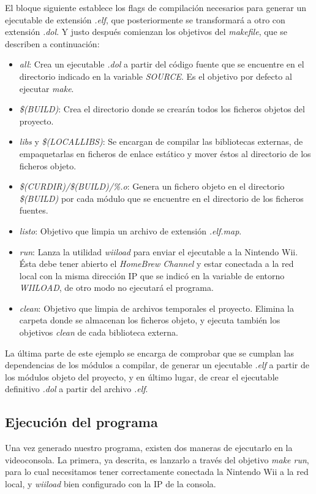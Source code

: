 El bloque siguiente establece los flags de compilación necesarios para generar un ejecutable de extensión \emph{.elf}, que posteriormente se transformará a otro con extensión \emph{.dol}. Y justo después comienzan los objetivos del \emph{makefile}, que se describen a continuación:

\begin{itemize}
\item \emph{all}: Crea un ejecutable \emph{.dol} a partir del código fuente que se encuentre en el directorio indicado en la variable \emph{SOURCE}. Es el objetivo por defecto al ejecutar \emph{make}.
\item \emph{\$(BUILD)}: Crea el directorio donde se crearán todos los ficheros objetos del proyecto.
\item \emph{libs} y \emph{\$(LOCALLIBS)}: Se encargan de compilar las bibliotecas externas, de empaquetarlas en ficheros de enlace estático y mover éstos al directorio de los ficheros objeto.
\item \emph{\$(CURDIR)/\$(BUILD)/\%.o}: Genera un fichero objeto en el directorio \emph{\$(BUILD)} por cada módulo que se encuentre en el directorio de los ficheros fuentes.
\item \emph{listo}: Objetivo que limpia un archivo de extensión \emph{.elf.map}.
\item \emph{run}: Lanza la utilidad \emph{wiiload} para enviar el ejecutable a la Nintendo Wii. Ésta debe tener abierto el \emph{HomeBrew Channel} y estar conectada a la red local con la misma dirección IP que se indicó en la variable de entorno \emph{WIILOAD}, de otro modo no ejecutará el programa.
\item \emph{clean}: Objetivo que limpia de archivos temporales el proyecto. Elimina la carpeta donde se almacenan los ficheros objeto, y ejecuta también los objetivos \emph{clean} de cada biblioteca externa.
\end{itemize}

La última parte de este ejemplo se encarga de comprobar que se cumplan las dependencias de los módulos a compilar, de generar un ejecutable \emph{.elf} a partir de los módulos objeto del proyecto, y en último lugar, de crear el ejecutable definitivo \emph{.dol} a partir del archivo \emph{.elf}.

\subsection{Ejecución del programa}

Una vez generado nuestro programa, existen dos maneras de ejecutarlo en la videoconsola. La primera, ya descrita, es lanzarlo a través del objetivo \emph{make run}, para lo cual necesitamos tener correctamente conectada la Nintendo Wii a la red local, y \emph{wiiload} bien configurado con la IP de la consola. \\

